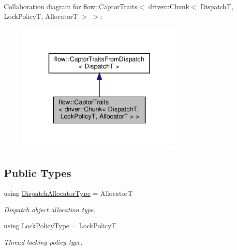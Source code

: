 Collaboration diagram for flow\+:\+:Captor\+Traits$<$ driver\+:\+:Chunk$<$ DispatchT, Lock\+PolicyT, AllocatorT $>$ $>$\+:\nopagebreak
\begin{figure}[H]
\begin{center}
\leavevmode
\includegraphics[width=236pt]{structflow_1_1_captor_traits_3_01driver_1_1_chunk_3_01_dispatch_t_00_01_lock_policy_t_00_01_allocator_t_01_4_01_4__coll__graph}
\end{center}
\end{figure}
\subsection*{Public Types}
\begin{DoxyCompactItemize}
\item 
\mbox{\label{structflow_1_1_captor_traits_3_01driver_1_1_chunk_3_01_dispatch_t_00_01_lock_policy_t_00_01_allocator_t_01_4_01_4_a07770eab4ba1ff08e96963d5b6a88a14}} 
using \hyperlink{structflow_1_1_captor_traits_3_01driver_1_1_chunk_3_01_dispatch_t_00_01_lock_policy_t_00_01_allocator_t_01_4_01_4_a07770eab4ba1ff08e96963d5b6a88a14}{Dispatch\+Allocator\+Type} = AllocatorT
\begin{DoxyCompactList}\small\item\em \hyperlink{classflow_1_1_dispatch}{Dispatch} object allocation type. \end{DoxyCompactList}\item 
\mbox{\label{structflow_1_1_captor_traits_3_01driver_1_1_chunk_3_01_dispatch_t_00_01_lock_policy_t_00_01_allocator_t_01_4_01_4_ad68b740483f594c894b4d99a3f771b84}} 
using \hyperlink{structflow_1_1_captor_traits_3_01driver_1_1_chunk_3_01_dispatch_t_00_01_lock_policy_t_00_01_allocator_t_01_4_01_4_ad68b740483f594c894b4d99a3f771b84}{Lock\+Policy\+Type} = Lock\+PolicyT
\begin{DoxyCompactList}\small\item\em Thread locking policy type. \end{DoxyCompactList}\end{DoxyCompactItemize}


